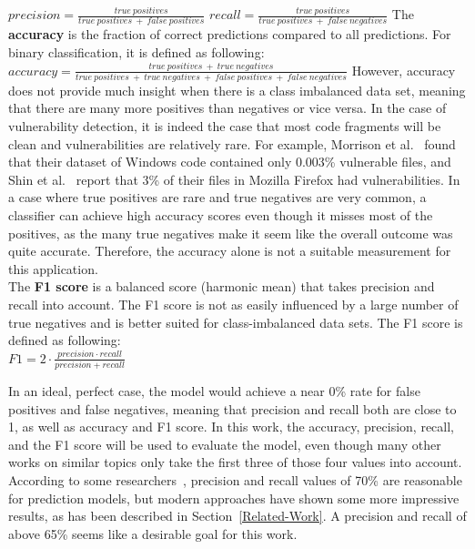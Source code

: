 \documentclass[
a4paper,
pagesize,
pdftex,
12pt,
twoside, %
BCOR=5mm, %
ngerman,
fleqn,
final,
]{scrartcl}
\begin{document}
	\mbox{}\newline
	$precision = \frac{true~positives}{true~positives~+~false~positives}$\newline
	\mbox{}\newline
	$recall = \frac{true~positives}{true~positives~+~false~negatives}$\newline
	\mbox{}\newline
	The \textbf{accuracy} is the fraction of correct predictions compared to all predictions. For binary classification, it is defined as following:  \newline
	\mbox{}\newline
	$accuracy = \frac{true~positives~+~true~negatives}{true~positives~+~true~negatives~+~false~positives~+~false~negatives}$\newline
	\mbox{}\newline
	However, accuracy does not provide much insight when there is a class imbalanced data set, meaning that there are many more positives than negatives or vice versa. In the case of vulnerability detection, it is indeed the case that most code fragments will be clean and vulnerabilities are relatively rare. For example, Morrison et al.~\cite{Morrison.2015} found that their dataset of Windows code contained only 0.003\% vulnerable files, and Shin et al.~\cite{Shin.2010} report that 3\% of their files in Mozilla Firefox had vulnerabilities. In a case where true positives are rare and true negatives are very common, a classifier can achieve high accuracy scores even though it misses most of the positives, as the many true negatives make it seem like the overall outcome was quite accurate. Therefore, the accuracy alone is not a suitable measurement for this application.\\
	The \textbf{F1 score} is a balanced score (harmonic mean) that takes precision and recall into account. The F1 score is not as easily influenced by a large number of true negatives and is better suited for class-imbalanced data sets. The F1 score is defined as following:\\
	\mbox{}\newline
	$F1 = 2 \cdot \frac{precision \cdot recall}{precision + recall}$
	\mbox{}\newline
	
	In an ideal, perfect case, the model would achieve a near 0\% rate for false positives and false negatives, meaning that precision and recall both are close to 1, as well as accuracy and F1 score. In this work, the accuracy, precision, recall, and the F1 score will be used to evaluate the model, even though many other works on similar topics only take the first three of those four values into account.\\
	According to some researchers~\cite{Morrison.2015,Shin.2013,Neuhaus.2007}, precision and recall values of 70\% are reasonable for prediction models, but modern approaches have shown some more impressive results, as has been described in Section~\ref{Related-Work}. A precision and recall of above 65\% seems like a desirable goal for this work.
	
\end{document}
